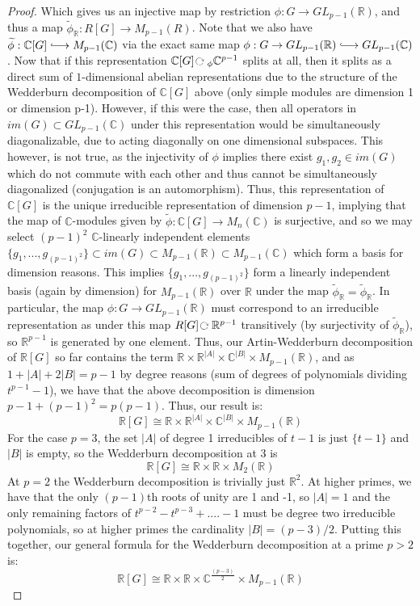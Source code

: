 \documentclass{article}
\newcommand{\bb}[1]{\mathbb{#1}}
\newcommand{\iso}{\cong}
\newcommand{\into}{\lhook\joinrel\longrightarrow}
\newcommand{\actson}{ \hspace{0.02in} \rotatebox[origin=c]{-90}{$\circlearrowright$}\ }
\begin{document}
\begin{proof}
    Which gives us an injective map by restriction $\phi: G \to GL_{p-1}(\bb{R})$, and thus a map $ \widetilde \phi_{\bb{R}} : R[G] \to M_{p-1}(R)$. Note that we also have $\widetilde \phi: \bb{C}[G] \into M_{p-1}(\bb{C})$ via the exact same map $\phi: G \to GL_{p-1}(\bb{R}) \into GL_{p-1}(\bb{C})$. Now that if this representation $\bb{C}[G] \actson_{\phi} \bb{C}^{p-1}$ splits at all, then it splits as a direct sum of $1$-dimensional abelian representations due to the structure of the Wedderburn decomposition of $\bb{C}[G]$ above (only simple modules are dimension 1 or dimension p-1). However, if this were the case, then all operators in $im(G) \subset GL_{p-1}(\bb{C})$ under this representation would be simultaneously diagonalizable, due to acting diagonally on one dimensional subspaces. This however, is not true, as the injectivity of $\phi$ implies there exist $g_{1}, g_{2} \in im(G)$ which do not commute with each other and thus cannot be simultaneously diagonalized (conjugation is an automorphism). Thus, this representation of $\bb{C}[G]$ is the unique irreducible representation of dimension $p-1$, implying that the map of $\bb{C}$-modules given by $\widetilde \phi: \bb{C}[G] \to M_{n}(\bb{C})$ is surjective, and so we may select $(p-1)^{2}$ $\bb{C}$-linearly independent elements $\{g_{1},...,g_{(p-1)^{2}}\}\subset im(G) \subset M_{p-1}(\bb{R}) \subset M_{p-1}(\bb{C})$ which form a basis for dimension reasons. This implies $\{g_{1},...,g_{(p-1)^{2}}\}$ form a linearly independent basis (again by dimension) for $M_{p-1}(\bb{R})$ over $\bb{R}$ under the map $\widetilde \phi_{\bb{R}} = \widetilde \phi_{\bb{R}}$. In particular, the map $\phi: G \to GL_{p-1}(\bb{R})$ must correspond to an irreducible representation as under this map $R[G]\actson \bb{R}^{p-1}$ transitively (by surjectivity of $\widetilde \phi_{\bb{R}}$), so $\bb{R}^{p-1}$ is generated by one element.
    Thus, our Artin-Wedderburn decomposition of $\bb{R}[G]$ so far contains the term $\bb{R} \times \bb{R}^{|A|} \times \bb{C}^{|B|} \times M_{p-1}(\bb{R})$, and as $1 + |A| + 2|B| = p-1$ by degree reasons (sum of degrees of polynomials dividing $t^{p-1}-1$), we have that the above decomposition is dimension $p-1 + (p-1)^{2} = p(p-1)$. Thus, our result is:
    \[
      \bb{R}[G] \iso \bb{R} \times \bb{R}^{|A|} \times \bb{C}^{|B|} \times M_{p-1}(\bb{R})
    \]
    For the case $p = 3$, the set $|A|$ of degree 1 irreducibles of $t-1$ is just $\{t-1\}$ and $|B|$ is empty, so the Wedderburn decomposition at $3$ is
     \[
      \bb{R}[G] \iso \bb{R} \times \bb{R} \times M_{2}(\bb{R})
    \]
    At $p = 2$ the Wedderburn decomposition is trivially just $\bb{R}^{2}$. At higher primes, we have that the only $(p-1)$th roots of unity are 1 and -1, so $|A| = 1$ and the only remaining factors of $t^{p-2}-t^{p-3}+....-1$ must be degree two irreducible polynomials, so at higher primes the cardinality $|B| = (p-3)/2$. Putting this together, our general formula for the Wedderburn decomposition at a prime $p>2$ is:
    \[
      \bb{R}[G] \iso \bb{R} \times \bb{R} \times \bb{C}^{\frac{(p-3)}{2}}\times M_{p-1}(\bb{R})
    \]
  \end{proof}
\end{document}
